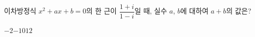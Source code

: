 이차방정식 $x^2+ax+b=0$의 한 근이 $\dfrac{1+i}{1-i}$일 때, 실수 $a$, $b$에 대하여 $a+b$의 값은?
\begin{choices32}{$-2$}{$-1$}{$0$}{$1$}{$2$}\end{choices32}

